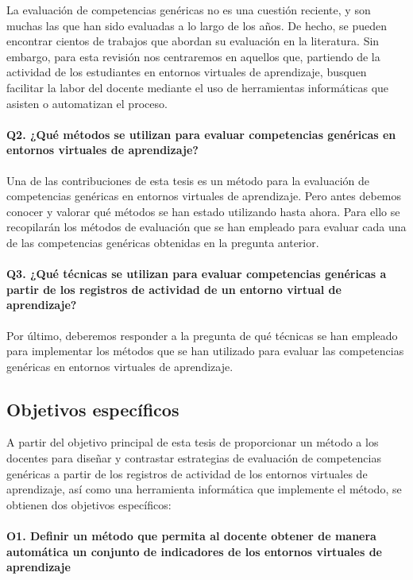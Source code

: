 La evaluación de competencias genéricas no es una cuestión reciente, y son muchas las que han sido evaluadas a lo largo de los años. De hecho, se pueden encontrar cientos de trabajos que abordan su evaluación en la literatura. Sin embargo, para esta revisión nos centraremos en aquellos que,  partiendo de la actividad de los estudiantes en entornos virtuales de aprendizaje, busquen facilitar la labor del docente mediante el uso de herramientas informáticas que asisten o automatizan el proceso.

\paragraph*{Q2. ¿Qué métodos se utilizan para evaluar competencias genéricas en entornos virtuales de aprendizaje?}

Una de las contribuciones de esta tesis es un método para la evaluación de competencias genéricas en entornos virtuales de aprendizaje. Pero antes debemos conocer y valorar qué métodos se han estado utilizando hasta ahora. Para ello se recopilarán los métodos de evaluación que se han empleado para evaluar cada una de las competencias genéricas obtenidas en la pregunta anterior.

\paragraph*{Q3. ¿Qué técnicas se utilizan para evaluar competencias genéricas a partir de los registros de actividad de un entorno virtual de aprendizaje?}

Por último, deberemos responder a la pregunta de qué técnicas se han empleado para implementar los métodos que se han utilizado para evaluar las competencias genéricas en entornos virtuales de aprendizaje.

\subsection*{Objetivos específicos}

A partir del objetivo principal de esta tesis de proporcionar un método a los docentes para diseñar y contrastar estrategias de evaluación de competencias genéricas a partir de los registros de actividad de los entornos virtuales de aprendizaje, así como una herramienta informática que implemente el método, se obtienen dos objetivos específicos:
 
\paragraph*{O1. Definir un método que permita al docente obtener de manera automática un conjunto de indicadores de los entornos virtuales de aprendizaje}


